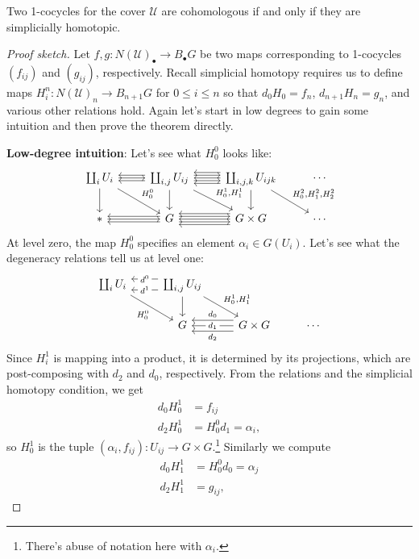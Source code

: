 \documentclass[11pt]{amsart}
\def\theshiftamount{2}
\begin{document}
\begin{theorem} Two 1-cocycles for the cover $\mathcal{U}$ are cohomologous if and only if they are simplicially homotopic.
\end{theorem}
\begin{proof}[Proof sketch] Let $f,g \colon N(\mathcal{U})_\bullet \to B_\bullet G$ be two maps corresponding to 1-cocycles $(f_{ij})$ and $(g_{ij})$, respectively. Recall simplicial homotopy requires us to define maps $H^n_i \colon N(\mathcal{U})_n \to B_{n+1}G$ for $0\le i\le n$ so that $d_0 H_0 = f_n$, $d_{n+1} H_n = g_n$, and various other relations hold. Again let's start in low degrees to gain some intuition and then prove the theorem directly.

\textbf{Low-degree intuition}: Let's see what $H_0^0$ looks like:
\def\theshiftamount{1}
\[ \begin{tikzcd}
    {\coprod_i U_i}\rar\dar\ar[dr,"H^0_0" above right] & {\coprod_{i,j}U_{ij}} \lar[shift left=\theshiftamount]\lar[shift right=\theshiftamount]\rar[shift left=\theshiftamount]\rar[shift right=\theshiftamount]\dar\ar[dr,"{H^1_0,H^1_1}" above right] & \coprod_{i,j,k} U_{ijk} \lar \lar[shift left=2*\theshiftamount]\lar[shift right=2*\theshiftamount]\dar\ar[dr,"{H_0^2,H_1^2,H_2^2}" above right] & \cdots \\
    \ast\rar & G \lar[shift left=\theshiftamount]\lar[shift right=\theshiftamount]\rar[shift left=\theshiftamount]\rar[shift right=\theshiftamount] & G \times G \lar \lar[shift left=2*\theshiftamount]\lar[shift right=2*\theshiftamount] & \cdots 
\end{tikzcd} \]
\def\theshiftamount{2}
At level zero, the map $H^0_0$ specifies an element $\alpha_i \in G(U_i)$. Let's see what the degeneracy relations tell us at level one:
\[ \begin{tikzcd}
    {\coprod_i U_i}\ar[dr,"H^0_0" below left] & {\coprod_{i,j}U_{ij}} \lar[shift left=\theshiftamount,"d^1" description]\lar[shift right=\theshiftamount,"d^0" description]\dar\ar[dr,"{H^1_0,H^1_1}" above right] &  \\
     & G & G \times G \lar["d_1" description] \lar[shift left=\theshiftamount,"d_2" below]\lar[shift right=\theshiftamount,"d_0" above] & \cdots 
\end{tikzcd} \]
Since $H_i^1$ is mapping into a product, it is determined by its projections, which are post-composing with $d_2$ and $d_0$, respectively. From the relations and the simplicial homotopy condition, we get
\begin{align*}
    d_0 H_0^1 &= f_{ij} \\
    d_2 H_0^1 &= H_0^0 d_1 = \alpha_i,
\end{align*}
so $H_0^1$ is the tuple $(\alpha_i,f_{ij}) \colon U_{ij} \to G \times G$.\footnote{There's abuse of notation here with $\alpha_i$.} Similarly we compute
\begin{align*}
    d_0 H_1^1 &= H_0^0 d_0 = \alpha_j \\
    d_2 H_1^1 &= g_{ij},
\end{align*}
 

\end{proof}
\end{document}
